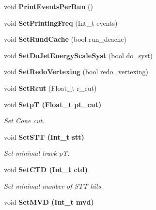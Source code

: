 \begin{CompactItemize}
\item 
void \textbf{Print\-Events\-Per\-Run} ()\label{classTMiniNtupleAnalyzer_47e828451d45c38d0868282b36e82ff2}

\item 
void \textbf{Set\-Printing\-Freq} (Int\_\-t events)\label{classTMiniNtupleAnalyzer_0f54ab2aa775179b9701ef8e7046775f}

\item 
void \textbf{Set\-Rund\-Cache} (bool run\_\-dcache)\label{classTMiniNtupleAnalyzer_b4c91f3788b04947d5722abb92fcaeff}

\item 
void \textbf{Set\-Do\-Jet\-Energy\-Scale\-Syst} (bool do\_\-syst)\label{classTMiniNtupleAnalyzer_e22f4d3617f21f45717d536393ae7d1d}

\item 
void \textbf{Set\-Redo\-Vertexing} (bool redo\_\-vertexing)\label{classTMiniNtupleAnalyzer_9dc051f8b05d12c4df23ba0d9fa01c09}

\item 
void \textbf{Set\-Rcut} (Float\_\-t r\_\-cut)\label{classTMiniNtupleAnalyzer_453f96bcd8c697328469551328401822}

\item 
void \bf{Setp\-T} (Float\_\-t pt\_\-cut)\label{classTMiniNtupleAnalyzer_8e067f95b28cb586b46de02b30359fd2}

\begin{CompactList}\small\item\em Set Cone cut. \item\end{CompactList}\item 
void \bf{Set\-STT} (Int\_\-t stt)\label{classTMiniNtupleAnalyzer_a00d97542e694747983ccfda316c58ed}

\begin{CompactList}\small\item\em Set minimal track p\-T. \item\end{CompactList}\item 
void \bf{Set\-CTD} (Int\_\-t ctd)\label{classTMiniNtupleAnalyzer_8861900ad6c57f4014d621c9a6b4e67e}

\begin{CompactList}\small\item\em Set minimal number of STT hits. \item\end{CompactList}\item 
void \bf{Set\-MVD} (Int\_\-t mvd)\label{classTMiniNtupleAnalyzer_ba084ef27cc6aa3d203ba9b4329901d1}


\end{CompactItemize}
